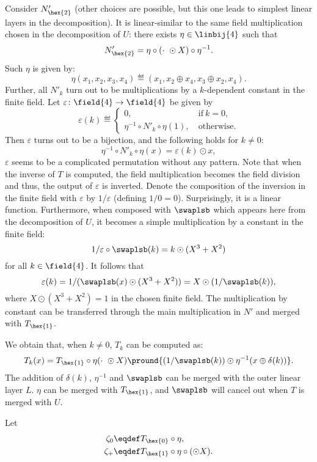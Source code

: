 Consider $N'_{\hex{2}}$ (other choices are possible, but this one leads to simplest linear layers in the decomposition). It is linear-similar to the same field multiplication chosen in the decomposition of $U$: there exists $\eta \in \linbij{4}$ such that
$$
N'_{\hex{2}} = \eta \circ (\cdot~\odot X) \circ \eta^{-1}.
$$
Such $\eta$ is given by:
$$
\eta(x_1, x_2, x_3, x_4) \eqdef (x_1, x_2 \oplus x_4, x_3 \oplus x_2, x_4).
$$
Further, all $N'_k$ turn out to be multiplications by a $k$-dependent constant in the finite field. Let $\varepsilon\colon \field{4} \to \field{4}$ be given by
$$
\varepsilon(k) \eqdef \begin{cases}
0, & ~\text{if}~ k = 0,\\
\eta^{-1} \circ N'_{k} \circ \eta (1), & ~\text{otherwise}.
\end{cases}
$$
Then $\varepsilon$ turns out to be a bijection, and the following holds for $k \ne 0$:
$$
\eta^{-1} \circ N'_{k} \circ \eta (x) = \varepsilon(k) \odot x,
$$
$\varepsilon$ seems to be a complicated permutation without any pattern. Note that when the inverse of $T$ is computed, the field multiplication becomes the field division and thus, the output of $\varepsilon$ is inverted. Denote the composition of the inversion in the finite field with $\varepsilon$ by $1/\varepsilon$ (defining $1/0 = 0$). Surprisingly, it is a linear function. Furthermore, when composed with $\swaplsb$ which appears here from the decomposition of $U$, it becomes a simple multiplication by a constant in the finite field:
$$
1/\varepsilon \circ \swaplsb(k) = k \odot (X^3 + X^2)
$$
for all $k \in \field{4}$.
It follows that
$$
\varepsilon(k) = 1/(\swaplsb(x) \odot (X^3 + X^2)) = X \odot (1 / \swaplsb(k)),
$$
where $X \odot (X^3 + X^2) = 1$ in the chosen finite field. The multiplication by constant can be transferred through the main multiplication in $N'$ and merged with $T_{\hex{1}}$.

We obtain that, when $k \ne 0$, $T_k$ can be computed as:
$$
T_k(x) = T_{\hex{1}} \circ \eta (\cdot~\odot X) \pround{
(1/\swaplsb(k)) \odot \eta^{-1} (x \oplus \delta(k))
}.
$$
The addition of $\delta(k)$, $\eta^{-1}$ and $\swaplsb$ can be merged with the outer linear layer $L$. $\eta$ can be merged with $T_{\hex{1}}$, and $\swaplsb$ will cancel out when $T$ is merged with $U$.

Let
\begin{align*}
\zeta_0 &\eqdef T_{\hex{0}} \circ \eta,\\
\zeta_+ &\eqdef T_{\hex{1}} \circ \eta \circ (\odot X).
\end{align*}


